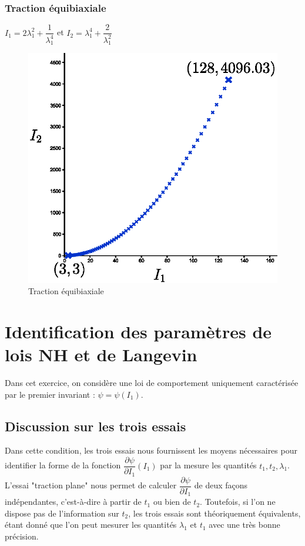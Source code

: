 \documentclass[a4paper,11pt]{article}
\begin{document}
\newpage
\subsubsection{Traction équibiaxiale}
$I_1=2\lambda_1^2+\dfrac{1}{\lambda_1^4}$ et $I_2=\lambda_1^4+\dfrac{2}{\lambda_1^2}$

\begin{figure}[!ht]
\centering\includegraphics[scale=0.8]{scilab/q2-6-3.eps}
\caption{Traction équibiaxiale}
\label{fig:tract_equi}
\end{figure}

\section{Identification des paramètres de lois NH et de Langevin}

Dans cet exercice, on considère une loi de comportement uniquement caractérisée par le premier invariant : $\psi = \psi(I_1)$.

\subsection {Discussion sur les trois essais}

Dans cette condition, les trois essais nous fournissent les moyens nécessaires pour identifier la forme de la fonction $\dfrac{\partial\psi}{\partial I_1} (I_1)$ par la mesure les quantités $t_1, t_2, \lambda_1$. L'essai "traction plane" nous permet de calculer $\dfrac{\partial\psi}{\partial I_1}$ de deux façons indépendantes, c'est-à-dire à partir de $t_1$ ou bien de $t_2$. Toutefois, si l'on ne dispose pas de l'information sur $t_2$, les trois essais sont théoriquement équivalents, étant donné que l'on peut mesurer les quantités $\lambda_1$ et $t_1$ avec une très bonne précision.
\end{document}
